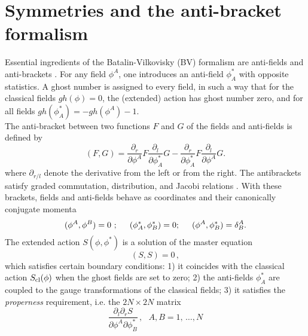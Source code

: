 \documentclass[a4paper,12pt]{article}
\begin{document}

\section{Symmetries and the anti-bracket formalism}
\label{sec:BV}

Essential ingredients of the Batalin-Vilkovisky (BV) formalism are
anti-fields and anti-brackets \cite{BV,cano,gomis}.  For any field
$\phi ^A$, one introduces an anti-field $\phi ^*_A$ with opposite
statistics.  A ghost number is assigned to every field, in such a way
that for the classical fields $gh(\phi) =0$, the (extended) action has
ghost number zero,
and for all fields $gh(\phi^*_A )= -gh(\phi ^A)-1$. \\

The {anti-bracket} between two functions $F$ and $G$ of
the fields and anti-fields is defined by
\begin{equation}\label{abracket}
\left( F, G \right) = 
\frac{\partial_r }{\partial\phi ^A}  F \frac{\partial_l }{\partial\phi
  ^*_A} G -  
\frac{\partial_r }{\partial\phi ^*_A} F  \frac{\partial_l
  }{\partial\phi ^A} G.   
\end{equation}
where $\partial_{r/l}$ denote the derivative from the left or from the
right.   
The antibrackets satisfy graded commutation, distribution, and Jacobi
relations \cite{BV}.  
With these brackets, fields and anti-fields behave as coordinates and
their canonically conjugate momenta   
\begin{equation}\label{eq:brackffs}
(\phi^A,\phi^B)=0\ ;\hspace{0.5cm}
(\phi^*_A,\phi^*_B)=0;\hspace{0.5cm}
(\phi^A,\phi^*_B)=\delta^A_B.
\end{equation}
%
The extended action $S(\phi,\phi^*)$ is a solution of the master equation  
\begin{equation}\label{master}
(S,S)=0\, ,
\end{equation}
which satisfies certain boundary conditions:
1) it coincides with the classical action $S_{\rm cl}(\phi)$
when the ghost fields are set to zero; 2) the
anti-fields $\phi^*_A$  
are coupled to the gauge transformations of the classical fields; 3)
it satisfies the \emph{properness} requirement, i.e. the $2N \times
2N$ matrix
\begin{displaymath}
  \frac{\partial_l \partial_r S}{\partial \phi^A \partial \phi_B^*}\, ,
  ~~~A,B = 1, \, \ldots, N
\end{displaymath}
\end{document}

